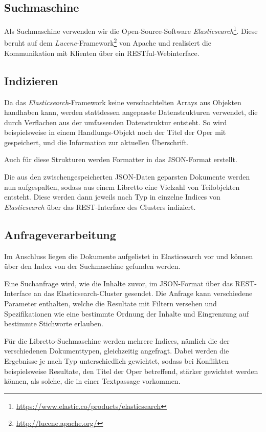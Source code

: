 \subsection{Suchmaschine}
Als Suchmaschine verwenden wir die Open-Source-Software
\emph{Elasticsearch}\footnote{\url{https://www.elastic.co/products/elasticsearch}}.
Diese beruht auf dem \emph{Lucene}-Framework\footnote{\url{http://lucene.apache.org/}} von Apache
und realisiert die Kommunikation mit Klienten
über ein RESTful-Webinterface.

\subsection{Indizieren}

Da das \emph{Elasticsearch}-Framework
keine verschachtelten Arrays aus Objekten handhaben kann,
werden stattdessen angepasste Datenstrukturen verwendet,
die durch Verflachen aus der umfassenden Datenstruktur entsteht.
So wird beispielsweise in einem Handlungs-Objekt
noch der Titel der Oper mit gespeichert,
und die Information zur aktuellen Überschrift.

Auch für diese Strukturen werden Formatter in das JSON-Format erstellt.

Die aus den zwischengespeicherten JSON-Daten geparsten Dokumente
werden nun aufgespalten, sodass aus einem Libretto eine Vielzahl von
Teilobjekten entsteht.
Diese werden dann jeweils nach Typ in einzelne Indices
von \emph{Elasticsearch} über das REST-Interface des Clusters indiziert.

\subsection{Anfrageverarbeitung}

Im Anschluss liegen die Dokumente aufgelistet in Elasticsearch vor
und können über den Index von der Suchmaschine gefunden werden.

Eine Suchanfrage wird, wie die Inhalte zuvor,
im JSON-Format über das REST-Interface an das Elasticsearch-Cluster gesendet.
Die Anfrage kann verschiedene Parameter enthalten,
welche die Resultate mit Filtern versehen
und Spezifikationen wie eine bestimmte Ordnung der Inhalte
und Eingrenzung auf bestimmte Stichworte erlauben.

Für die Libretto-Suchmaschine werden mehrere Indices,
nämlich die der verschiedenen Dokumenttypen,
gleichzeitig angefragt.
Dabei werden die Ergebnisse je nach Typ unterschiedlich gewichtet,
sodass bei Konflikten beispielsweise Resultate,
den Titel der Oper betreffend,
stärker gewichtet werden können,
als solche, die in einer Textpassage vorkommen.

